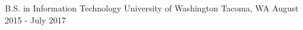 

\begin{cvedus}

  \cvedu
    {B.S. in Information Technology} %
    {University of Washington}%
    {Tacoma, WA}%
    {August 2015 - July 2017}%

\end{cvedus}
